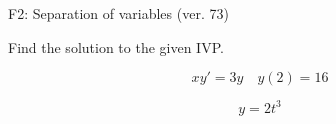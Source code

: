 \begin{exercise}
  \begin{exerciseTitle}F2: Separation of variables (ver. 73)\end{exerciseTitle}
  \begin{exerciseStatement}
    
Find the solution to the given IVP.

    
\[xy'= 3 y \hspace{1em} y( 2 ) = 16\]

  \end{exerciseStatement}
  \begin{exerciseAnswer}
    
\[y= 2 t^ 3\]

  \end{exerciseAnswer}
\end{exercise}